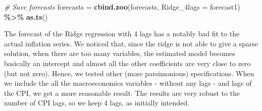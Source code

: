 \documentclass[
]{article}
\newenvironment{Shaded}{\begin{snugshade}}{\end{snugshade}}
\newcommand{\AttributeTok}[1]{\textcolor[rgb]{0.13,0.29,0.53}{#1}}
\newcommand{\CommentTok}[1]{\textcolor[rgb]{0.56,0.35,0.01}{\textit{#1}}}
\newcommand{\FunctionTok}[1]{\textcolor[rgb]{0.13,0.29,0.53}{\textbf{#1}}}
\newcommand{\NormalTok}[1]{#1}
\newcommand{\OtherTok}[1]{\textcolor[rgb]{0.56,0.35,0.01}{#1}}
\newcommand{\SpecialCharTok}[1]{\textcolor[rgb]{0.81,0.36,0.00}{\textbf{#1}}}
\begin{document}
\begin{Shaded}
\begin{Highlighting}[]
\CommentTok{\# Save forecasts}
\NormalTok{forecasts }\OtherTok{=} \FunctionTok{cbind.zoo}\NormalTok{(forecasts, }\AttributeTok{Ridge\_4lags =}\NormalTok{ forecast1) }\SpecialCharTok{\%\textgreater{}\%} \FunctionTok{as.ts}\NormalTok{()}
\end{Highlighting}
\end{Shaded}

The forecast of the Ridge regression with 4 lags has a notably bad fit
to the actual inflation series. We noticed that, since the ridge is not
able to give a sparse solution, when there are too many variables, the
estimated model becomes basically an intercept and almost all the other
coefficients are very close to zero (but not zero). Hence, we tested
other (more parsimonious) specifications. When we include the all the
macroeconomics variables - without any lags - and lags of the CPI, we
get a more reasonable result. The results are very robust to the number
of CPI lags, so we keep 4 lags, as initially intended.
\end{document}
